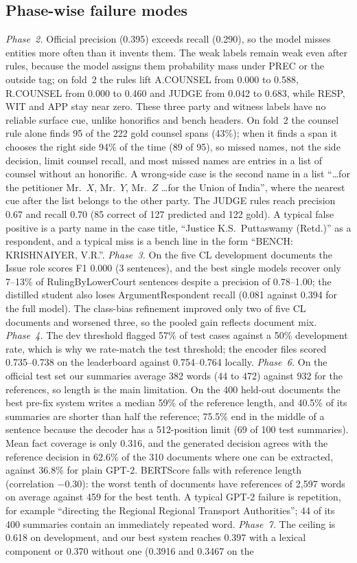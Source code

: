 \documentclass[10pt,a4paper]{article}
\begin{document}
\subsection{Phase-wise failure modes}
\emph{Phase~2.} Official precision (0.395) exceeds recall (0.290), so the model misses entities more often than it invents them. The weak labels remain weak even after rules, because the model assigns them probability mass under PREC or the outside tag; on fold~2 the rules lift A.COUNSEL from 0.000 to 0.588, R.COUNSEL from 0.000 to 0.460 and JUDGE from 0.042 to 0.683, while RESP, WIT and APP stay near zero. These three party and witness labels have no reliable surface cue, unlike honorifics and bench headers. On fold~2 the counsel rule alone finds 95 of the 222 gold counsel spans (43\%); when it finds a span it chooses the right side 94\% of the time (89 of 95), so missed names, not the side decision, limit counsel recall, and most missed names are entries in a list of counsel without an honorific. A wrong-side case is the second name in a list ``\ldots for the petitioner Mr.\ $X$, Mr.\ $Y$, Mr.\ $Z$ \ldots for the Union of India'', where the nearest cue after the list belongs to the other party. The JUDGE rules reach precision 0.67 and recall 0.70 (85 correct of 127 predicted and 122 gold). A typical false positive is a party name in the case title, ``Justice K.S.\ Puttaswamy (Retd.)'' as a respondent, and a typical miss is a bench line in the form ``BENCH: KRISHNAIYER, V.R.''. \emph{Phase~3.} On the five CL development documents the Issue role scores F1 0.000 (3 sentences), and the best single models recover only 7--13\% of RulingByLowerCourt sentences despite a precision of 0.78--1.00; the distilled student also loses ArgumentRespondent recall (0.081 against 0.394 for the full model). The class-bias refinement improved only two of five CL documents and worsened three, so the pooled gain reflects document mix. \emph{Phase~4.} The dev threshold flagged 57\% of test cases against a 50\% development rate, which is why we rate-match the test threshold; the encoder files scored 0.735--0.738 on the leaderboard against 0.754--0.764 locally. \emph{Phase~6.} On the official test set our summaries average 382 words (44 to 472) against 932 for the references, so length is the main limitation. On the 400 held-out documents the best pre-fix system writes a median 59\% of the reference length, and 40.5\% of its summaries are shorter than half the reference; 75.5\% end in the middle of a sentence because the decoder has a 512-position limit (69 of 100 test summaries). Mean fact coverage is only 0.316, and the generated decision agrees with the reference decision in 62.6\% of the 310 documents where one can be extracted, against 36.8\% for plain GPT-2. BERTScore falls with reference length (correlation $-0.30$): the worst tenth of documents have references of 2{,}597 words on average against 459 for the best tenth. A typical GPT-2 failure is repetition, for example ``directing the Regional Regional Transport Authorities''; 44 of its 400 summaries contain an immediately repeated word. \emph{Phase~7.} The ceiling is 0.618 on development, and our best system reaches 0.397 with a lexical component or 0.370 without one (0.3916 and 0.3467 on the 
\end{document}
